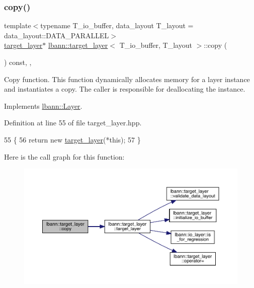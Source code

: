 \subsubsection{\texorpdfstring{copy()}{copy()}}
{\footnotesize\ttfamily template$<$typename T\+\_\+io\+\_\+buffer, data\+\_\+layout T\+\_\+layout = data\+\_\+layout\+::\+D\+A\+T\+A\+\_\+\+P\+A\+R\+A\+L\+L\+EL$>$ \\
\hyperlink{classlbann_1_1target__layer}{target\+\_\+layer}$\ast$ \hyperlink{classlbann_1_1target__layer}{lbann\+::target\+\_\+layer}$<$ T\+\_\+io\+\_\+buffer, T\+\_\+layout $>$\+::copy (\begin{DoxyParamCaption}{ }\end{DoxyParamCaption}) const\hspace{0.3cm}{\ttfamily [inline]}, {\ttfamily [override]}, {\ttfamily [virtual]}}

Copy function. This function dynamically allocates memory for a layer instance and instantiates a copy. The caller is responsible for deallocating the instance. 

Implements \hyperlink{classlbann_1_1Layer_af420f22bbac801c85483ade84588a23f}{lbann\+::\+Layer}.



Definition at line 55 of file target\+\_\+layer.\+hpp.


\begin{DoxyCode}
55                                       \{
56     \textcolor{keywordflow}{return} \textcolor{keyword}{new} \hyperlink{classlbann_1_1target__layer_ab06729051345c739c33ea445ceed100a}{target\_layer}(*\textcolor{keyword}{this});
57   \}
\end{DoxyCode}
Here is the call graph for this function\+:\nopagebreak
\begin{figure}[H]
\begin{center}
\leavevmode
\includegraphics[width=350pt]{classlbann_1_1target__layer_a7cff9e162514ee6c8be9803ba3902fca_cgraph}
\end{center}
\end{figure}
\mbox{\label{classlbann_1_1target__layer_a48a5f44e5f453ce31923333fd11849b1}} 
